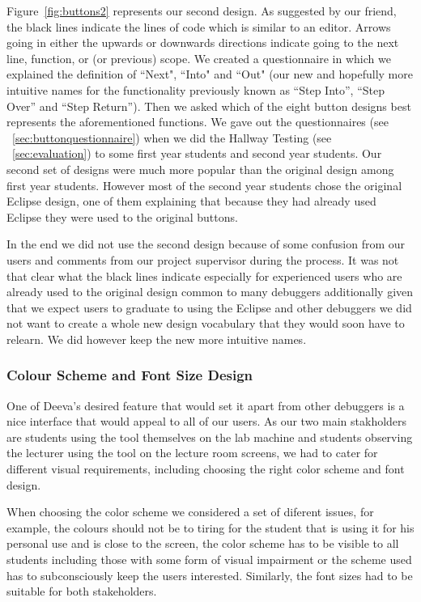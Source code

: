 \documentclass[11pt, a4paper]{article}
\begin{document}
Figure~\ref{fig:buttons2} represents our second design.
As suggested by our friend, the black lines indicate the lines of code which is similar to an editor.
Arrows going in either the upwards or downwards directions indicate going to the next line, function, or (or previous) scope.
We created a questionnaire in which we explained the definition of ``Next", ``Into" and ``Out" (our new and hopefully more intuitive names for the functionality previously known as ``Step Into'', ``Step Over'' and ``Step Return'').
Then we asked which of the eight button designs best represents the aforementioned functions.
We gave out the questionnaires (see ~\cref{sec:buttonquestionnaire}) when we did the Hallway Testing (see ~\cref{sec:evaluation}) to some first year students and second year students.
Our second set of designs were much more popular than the original design among first year students.
However most of the second year students chose the original Eclipse design, one of them explaining that because they had already used Eclipse they were used to the original buttons.

In the end we did not use the second design because of some confusion from our users and comments from our project supervisor during the process. 
It was not that clear what the black lines indicate especially for experienced users who are already used to the original design common to many debuggers additionally given that we expect users to graduate to using the Eclipse and other debuggers we did not want to create a whole new design vocabulary that they would soon have to relearn. 
We did however keep the new more intuitive names.

\subsubsection{Colour Scheme and Font Size Design}
One of Deeva's desired feature that would set it apart from other debuggers is a nice interface that would appeal to all of our users. 
As our two main stakholders are students using the tool themselves on the lab machine and students observing the lecturer using the tool on the lecture room screens, we had to cater for different visual requirements, including choosing the right color scheme and font design.

When choosing the color scheme we considered a set of diferent issues, for example, the colours should not be to tiring for the student that is using it for his personal use and is close to the screen, the color scheme has to be visible to all students including those with some form of visual impairment or the scheme used has to subconsciously keep the users interested. 
Similarly, the font sizes had to be suitable for both stakeholders.
\end{document}
